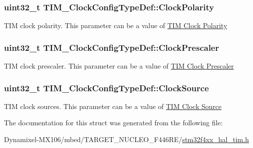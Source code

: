 \subsubsection[{\texorpdfstring{Clock\+Polarity}{ClockPolarity}}]{\setlength{\rightskip}{0pt plus 5cm}uint32\+\_\+t T\+I\+M\+\_\+\+Clock\+Config\+Type\+Def\+::\+Clock\+Polarity}\hypertarget{struct_t_i_m___clock_config_type_def_a66453fa8dc8a300267ff5aba08eff5c4}{}\label{struct_t_i_m___clock_config_type_def_a66453fa8dc8a300267ff5aba08eff5c4}
T\+IM clock polarity. This parameter can be a value of \hyperlink{group___t_i_m___clock___polarity}{T\+IM Clock Polarity} 
\subsubsection[{\texorpdfstring{Clock\+Prescaler}{ClockPrescaler}}]{\setlength{\rightskip}{0pt plus 5cm}uint32\+\_\+t T\+I\+M\+\_\+\+Clock\+Config\+Type\+Def\+::\+Clock\+Prescaler}\hypertarget{struct_t_i_m___clock_config_type_def_ae4c0cb6f58da0ec7b99f1c6411d2fee1}{}\label{struct_t_i_m___clock_config_type_def_ae4c0cb6f58da0ec7b99f1c6411d2fee1}
T\+IM clock prescaler. This parameter can be a value of \hyperlink{group___t_i_m___clock___prescaler}{T\+IM Clock Prescaler} 
\subsubsection[{\texorpdfstring{Clock\+Source}{ClockSource}}]{\setlength{\rightskip}{0pt plus 5cm}uint32\+\_\+t T\+I\+M\+\_\+\+Clock\+Config\+Type\+Def\+::\+Clock\+Source}\hypertarget{struct_t_i_m___clock_config_type_def_a54c329013b5f6f87d1c3d2495fca84d2}{}\label{struct_t_i_m___clock_config_type_def_a54c329013b5f6f87d1c3d2495fca84d2}
T\+IM clock sources. This parameter can be a value of \hyperlink{group___t_i_m___clock___source}{T\+IM Clock Source} 

The documentation for this struct was generated from the following file\+:\begin{DoxyCompactItemize}
\item 
Dynamixel-\/\+M\+X106/mbed/\+T\+A\+R\+G\+E\+T\+\_\+\+N\+U\+C\+L\+E\+O\+\_\+\+F446\+R\+E/\hyperlink{stm32f4xx__hal__tim_8h}{stm32f4xx\+\_\+hal\+\_\+tim.\+h}\end{DoxyCompactItemize}
